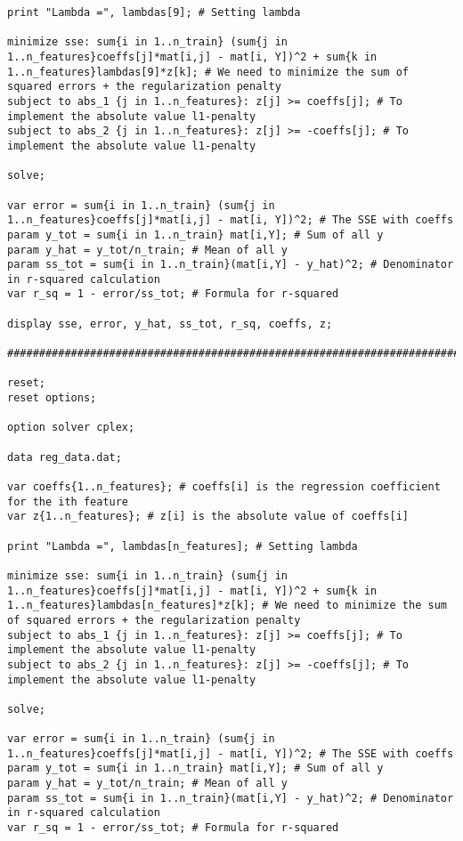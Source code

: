 \documentclass[15pt,a4paper,openright]{article}
\begin{document}
\begin{lstlisting}[language=AMPL, caption=1c Code]
print "Lambda =", lambdas[9]; # Setting lambda

minimize sse: sum{i in 1..n_train} (sum{j in 1..n_features}coeffs[j]*mat[i,j] - mat[i, Y])^2 + sum{k in 1..n_features}lambdas[9]*z[k]; # We need to minimize the sum of squared errors + the regularization penalty
subject to abs_1 {j in 1..n_features}: z[j] >= coeffs[j]; # To implement the absolute value l1-penalty
subject to abs_2 {j in 1..n_features}: z[j] >= -coeffs[j]; # To implement the absolute value l1-penalty

solve;

var error = sum{i in 1..n_train} (sum{j in 1..n_features}coeffs[j]*mat[i,j] - mat[i, Y])^2; # The SSE with coeffs
param y_tot = sum{i in 1..n_train} mat[i,Y]; # Sum of all y
param y_hat = y_tot/n_train; # Mean of all y
param ss_tot = sum{i in 1..n_train}(mat[i,Y] - y_hat)^2; # Denominator in r-squared calculation
var r_sq = 1 - error/ss_tot; # Formula for r-squared

display sse, error, y_hat, ss_tot, r_sq, coeffs, z;

#############################################################################

reset;
reset options;

option solver cplex;

data reg_data.dat;

var coeffs{1..n_features}; # coeffs[i] is the regression coefficient for the ith feature
var z{1..n_features}; # z[i] is the absolute value of coeffs[i]

print "Lambda =", lambdas[n_features]; # Setting lambda

minimize sse: sum{i in 1..n_train} (sum{j in 1..n_features}coeffs[j]*mat[i,j] - mat[i, Y])^2 + sum{k in 1..n_features}lambdas[n_features]*z[k]; # We need to minimize the sum of squared errors + the regularization penalty
subject to abs_1 {j in 1..n_features}: z[j] >= coeffs[j]; # To implement the absolute value l1-penalty
subject to abs_2 {j in 1..n_features}: z[j] >= -coeffs[j]; # To implement the absolute value l1-penalty

solve;

var error = sum{i in 1..n_train} (sum{j in 1..n_features}coeffs[j]*mat[i,j] - mat[i, Y])^2; # The SSE with coeffs
param y_tot = sum{i in 1..n_train} mat[i,Y]; # Sum of all y
param y_hat = y_tot/n_train; # Mean of all y
param ss_tot = sum{i in 1..n_train}(mat[i,Y] - y_hat)^2; # Denominator in r-squared calculation
var r_sq = 1 - error/ss_tot; # Formula for r-squared


\end{lstlisting}
\end{document}
